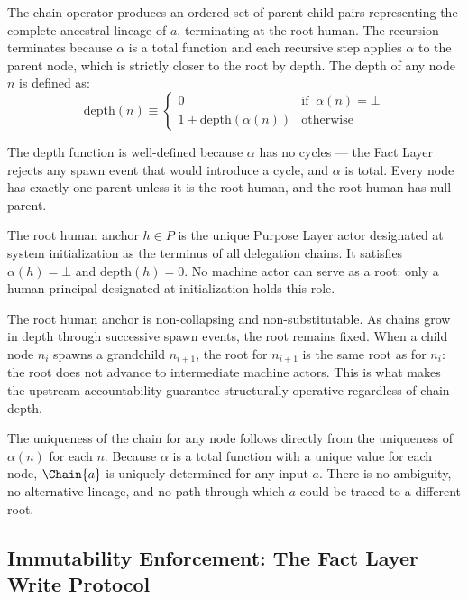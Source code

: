 The chain operator produces an ordered set of parent-child pairs representing the complete ancestral lineage of $a$, terminating at the root human. The recursion terminates because $\alpha$ is a total function and each recursive step applies $\alpha$ to the parent node, which is strictly closer to the root by depth. The depth of any node $n$ is defined as:
\begin{equation}
\mathrm{depth}(n) \equiv
\begin{cases}
0 & \text{if }\ \alpha(n) = \bot \\
1 + \mathrm{depth}(\alpha(n)) & \text{otherwise}
\end{cases}
\label{eq:depth-definition}
\end{equation}

The depth function is well-defined because $\alpha$ has no cycles --- the Fact Layer rejects any spawn event that would introduce a cycle, and $\alpha$ is total. Every node has exactly one parent unless it is the root human, and the root human has null parent.

\begin{dfn}\label{dfn:root-human}
The root human anchor $h \in P$ is the unique Purpose Layer actor designated at system initialization as the terminus of all delegation chains. It satisfies $\alpha(h) = \bot$ and $\mathrm{depth}(h) = 0$. No machine actor can serve as a root: only a human principal designated at initialization holds this role.
\end{dfn}

The root human anchor is non-collapsing and non-substitutable. As chains grow in depth through successive spawn events, the root remains fixed. When a child node $n_i$ spawns a grandchild $n_{i+1}$, the root for $n_{i+1}$ is the same root as for $n_i$: the root does not advance to intermediate machine actors. This is what makes the upstream accountability guarantee structurally operative regardless of chain depth.

The uniqueness of the chain for any node follows directly from the uniqueness of $\alpha(n)$ for each $n$. Because $\alpha$ is a total function with a unique value for each node, $\Chain{a}$ is uniquely determined for any input $a$. There is no ambiguity, no alternative lineage, and no path through which $a$ could be traced to a different root.

\subsection{Immutability Enforcement: The Fact Layer Write Protocol}
\label{sec:fact-layer-enforcement}

